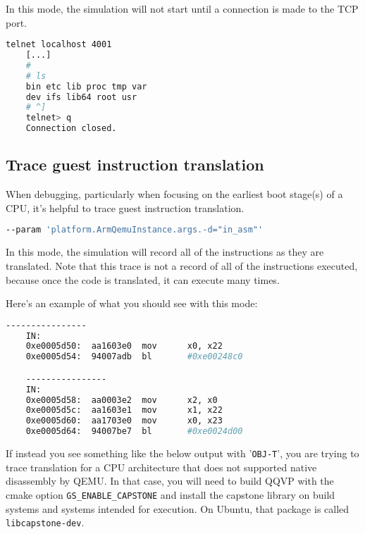 In this mode, the simulation will not start until a connection is made to the TCP port.

\small
\begin{lstlisting}[language=bash]
    telnet localhost 4001
    [...]
    #
    # ls
    bin etc lib proc tmp var
    dev ifs lib64 root usr
    # ^]
    telnet> q
    Connection closed.
\end{lstlisting}
\normalsize


\subsection{Trace guest instruction translation}

When debugging, particularly when focusing on the earliest boot stage(s)
of a CPU, it's helpful to trace guest instruction translation. \leavevmode

\small
\begin{lstlisting}[language=bash]
    --param 'platform.ArmQemuInstance.args.-d="in_asm"'
\end{lstlisting}
\normalsize

In this mode, the simulation will record all of the instructions as they
are translated. Note that this trace is not a record of all of the instructions
executed, because once the code is translated, it can execute many times.

Here's an example of what you should see with this mode:

\small
\begin{lstlisting}[language=bash]
    ----------------
    IN:
    0xe0005d50:  aa1603e0  mov      x0, x22
    0xe0005d54:  94007adb  bl       #0xe00248c0

    ----------------
    IN:
    0xe0005d58:  aa0003e2  mov      x2, x0
    0xe0005d5c:  aa1603e1  mov      x1, x22
    0xe0005d60:  aa1703e0  mov      x0, x23
    0xe0005d64:  94007be7  bl       #0xe0024d00
\end{lstlisting}
\normalsize

If instead you see something like the below output with
'{\small{\lstinline!OBJ-T!}}', you are trying to trace translation for a
CPU architecture that does not supported native disassembly by QEMU. In
that case, you will need to build QQVP with the cmake option
{\small{\lstinline!GS_ENABLE_CAPSTONE!}} and install the capstone library
on build systems and systems intended for execution.  On Ubuntu, that package
is called {\small{\lstinline!libcapstone-dev!}}.

